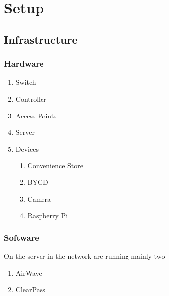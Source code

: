 \chapter{Setup}

\section{Infrastructure}
\subsection{Hardware}

\begin{enumerate}
	\item Switch \\
	\item Controller \\
	\item Access Points \\
	\item Server \\
	\item Devices \\
	\begin{enumerate}
		\item Convenience Store \\
		\item BYOD \\
		\item Camera \\
		\item Raspberry Pi \\
	\end{enumerate}
\end{enumerate}

\subsection{Software}
On the server in the network are running mainly two 
\begin{enumerate}
	\item AirWave \\
	\item ClearPass \\
\end{enumerate}